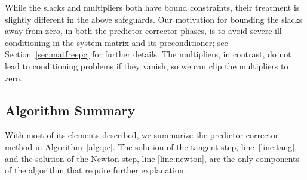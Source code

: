 While the slacks and multipliers both have bound constraints, their treatment is
slightly different in the above safeguards.  Our motivation for bounding the
slacks away from zero, in both the predictor corrector phases, is to avoid
severe ill-conditioning in the system matrix and its preconditioner; see
Section~\ref{sec:matfreepc} for further details.  The multipliers, in contrast,
do not lead to conditioning problems if they vanish, so we can clip the
multipliers to zero.

\subsection{Algorithm Summary}

With most of its elements described, we summarize the predictor-corrector method
in Algorithm~\ref{alg:pc}.  The solution of the tangent step,
line~\ref{line:tang}, and the solution of the Newton step, line
\ref{line:newton}, are the only components of the algorithm that require further
explanation.  %
\\
\LinesNumberedHidden
